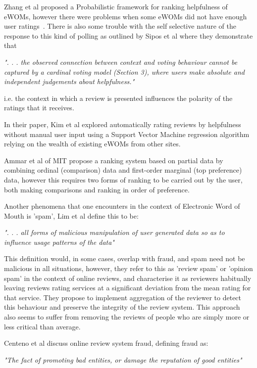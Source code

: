 Zhang et al proposed a Probabilistic framework for ranking helpfulness of eWOMs, however there were problems when some eWOMs did not have enough user ratings~\cite{Zhang}. There is also some trouble with the self selective nature of the response to this kind of polling as outlined by Sipos et al\cite{Sipos} where they demonstrate that 

\emph{". . . the observed connection between context and voting  behaviour  cannot  be  captured  by  a  cardinal  voting model (Section 3), where users make absolute and independent judgements about helpfulness."}

i.e. the context in which a review is presented influences the polarity of the ratings that it receives.

In their paper, Kim et al\cite{Kim} explored automatically rating reviews by helpfulness without manual user input using a Support Vector Machine regression algorithm relying on the wealth of existing eWOMs from other sites. 

Ammar et al\cite{Ammar} of MIT propose a ranking system based on partial data by combining ordinal (comparison) data and first-order marginal (top preference) data, however this requires two forms of ranking to be carried out by the user, both making comparisons and ranking in order of preference.

Another phenomena that one encounters in the context of Electronic Word of Mouth is 'spam', Lim et al\cite{Lim} define this to be:

\emph{". . . all forms of malicious manipulation of user generated data so as to influence usage patterns of the data"}

This definition would, in some cases, overlap with fraud, and spam need not be malicious in all situations, however, they refer to this as 'review spam' or 'opinion spam' in the context of online reviews, and characterise it as reviewers habitually leaving reviews rating services at a significant deviation from the mean rating for that service. They propose to implement aggregation of the reviewer to detect this behaviour and preserve the integrity of the review system. This approach also seems to suffer from removing the reviews of people who are simply more or less critical than average.

Centeno et al\cite{Centeno} discuss online review system fraud, defining fraud as:

\emph{"The fact of promoting bad entities, or damage the reputation of good entities"} 

